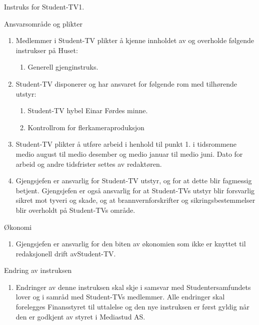 \begin{instruks}{Instruks for Student-TV}{1. }{}
    \begin{instruksledd}{Ansvarsområde og plikter}
        \begin{enumerate}   
            \item  Medlemmer i Student-TV plikter å kjenne innholdet av og overholde følgende
                instrukser på Huset:
                \begin{enumerate}
                    \item Generell gjenginstruks.
                \end{enumerate}
            \item Student-TV disponerer og har ansvaret for følgende rom med tilhørende utstyr:
                \begin{enumerate}
                    \item Student-TV hybel Einar Førdes minne.
                    \item Kontrollrom for flerkameraproduksjon
                \end{enumerate}
            \item Student-TV plikter å utføre arbeid i henhold til punkt 1. i tidsrommene
                medio august til medio desember og medio januar til medio juni. Dato for arbeid og andre tidsfrister
                settes av redaktøren.
            \item Gjengsjefen er ansvarlig for Student-TV utstyr, og for at dette blir fagmessig
                betjent. Gjengsjefen er også ansvarlig for at Student-TVs utstyr blir forsvarlig sikret mot tyveri
                og skade, og at brannvernforskrifter og sikringsbestemmelser blir overholdt på Student-TVs område.
        \end{enumerate}
    \end{instruksledd}

    \begin{instruksledd}{Økonomi}
        \begin{enumerate}
            \item Gjengsjefen er ansvarlig for den biten av økonomien som ikke er knyttet til
                redaksjonell drift avStudent-TV.
        \end{enumerate}
    \end{instruksledd}

    \begin{instruksledd}{Endring av instruksen}
        \begin{enumerate}
            \item Endringer av denne instruksen skal skje i samsvar med Studentersamfundets
                lover og i samråd med Student-TVs medlemmer. Alle endringer skal forelegges Finansstyret til
                uttalelse og den nye instruksen er først gyldig når den er godkjent av styret i Mediastud AS.
        \end{enumerate}
    \end{instruksledd}


\end{instruks}
